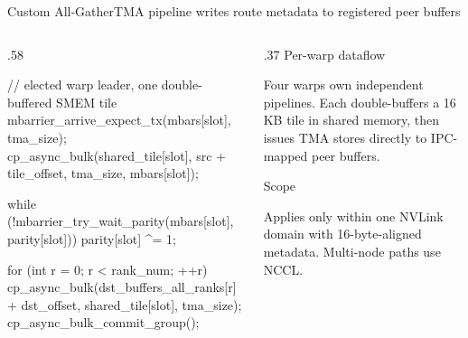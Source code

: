 \documentclass[aspectratio=169,10pt]{beamer}
\renewcommand{\NvidiaSource}[1]{}
\newcommand{\LocalSource}[1]{\NvidiaSource{\texttt{#1}}}
\begin{document}
\begin{frame}[fragile]{Custom All-Gather}{TMA pipeline writes route metadata to registered peer buffers}
  \LocalSource{DeepEP/csrc/hybrid_ep/extension/allgather.cu}
  \begin{columns}[T,onlytextwidth]
    \begin{column}{.58\textwidth}
      \begin{NvidiaCode}[language=NvidiaCUDA,basicstyle=\ttfamily\fontsize{6.0}{7.1}\selectfont]
// elected warp leader, one double-buffered SMEM tile
mbarrier_arrive_expect_tx(mbars[slot], tma_size);
cp_async_bulk(shared_tile[slot], src + tile_offset,
              tma_size, mbars[slot]);

while (!mbarrier_try_wait_parity(mbars[slot], parity[slot])) {}
parity[slot] ^= 1;

for (int r = 0; r < rank_num; ++r)
  cp_async_bulk(dst_buffers_all_ranks[r] + dst_offset,
                shared_tile[slot], tma_size);
cp_async_bulk_commit_group();
      \end{NvidiaCode}
    \end{column}
    \begin{column}{.37\textwidth}
      {\NvidiaSansMedium Per-warp dataflow}\NvidiaTightRule{.6pt}\vspace{.04in}
      {\fontsize{8.4}{9.8}\selectfont\setlength{\parskip}{0pt}\noindent
      Four warps own independent pipelines. Each double-buffers a 16 KB tile in shared memory,
      then issues TMA stores directly to IPC-mapped peer buffers.\par}
      \vspace{.12in}
      {\NvidiaSansMedium Scope}\NvidiaTightRule{.6pt}\vspace{.04in}
      {\fontsize{8.4}{9.8}\selectfont\setlength{\parskip}{0pt}\noindent
      Applies only within one NVLink domain with 16-byte-aligned metadata. Multi-node paths use
      NCCL.\par}
    \end{column}
  \end{columns}
\end{frame}
\end{document}
